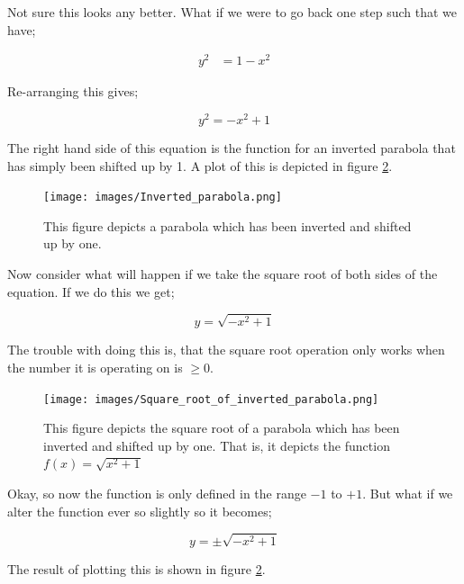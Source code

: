 \documentclass{article}
\begin{document}
Not sure this looks any better. What if we were to go back one step such that we have;

\begin{align*}
y^{2} &= 1 - x^{2}
\end{align*}

Re-arranging this gives;

\begin{equation*}
y^{2} = -x^{2} + 1
\end{equation*}

The right hand side of this equation is the function for an inverted parabola that has simply been shifted up by 1.
A plot of this is depicted in figure \ref{fig:Inverted_parabola}.

\begin{figure}
  \texttt{[image: images/Inverted\_parabola.png]}
  \caption{This figure depicts a parabola which has been inverted and shifted up by one.}
  \label{fig:Inverted_parabola}
\end{figure}

Now consider what will happen if we take the square root of both sides of the equation. If we do this we get;

\begin{equation}
\label{eqn:Semi_circle}
y = \sqrt{-x^{2} + 1}
\end{equation}

The trouble with doing this is, that the square root operation only works when the number it is operating on is
$\geq 0$.\\

\begin{figure}
  \texttt{[image: images/Square\_root\_of\_inverted\_parabola.png]}
  \caption{This figure depicts the square root of a parabola which has been inverted and shifted up by one. That is,
  it depicts the function $f(x) = \sqrt{x^{2} + 1}$}
  \label{fig:Inverted_parabola}
\end{figure}

Okay, so now the function is only defined in the range $-1$ to $+1$. But what if we alter the function ever so
slightly so it becomes;

\begin{equation*}
y = \pm\sqrt{-x^{2} + 1}
\end{equation*}

The result of plotting this is shown in figure \ref{fig:Inverted_parabola}.
\end{document}
